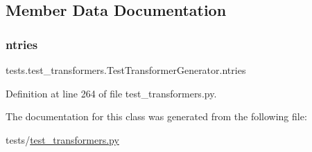 \subsection{Member Data Documentation}
\mbox{\label{classtests_1_1test__transformers_1_1TestTransformerGenerator_a1555f81fb11a5497f644e99607c3d17d}} 
\subsubsection{\texorpdfstring{ntries}{ntries}}
{\footnotesize\ttfamily tests.\+test\+\_\+transformers.\+Test\+Transformer\+Generator.\+ntries\hspace{0.3cm}{\ttfamily [static]}}



Definition at line 264 of file test\+\_\+transformers.\+py.



The documentation for this class was generated from the following file\+:\begin{DoxyCompactItemize}
\item 
tests/\hyperlink{test__transformers_8py}{test\+\_\+transformers.\+py}\end{DoxyCompactItemize}

